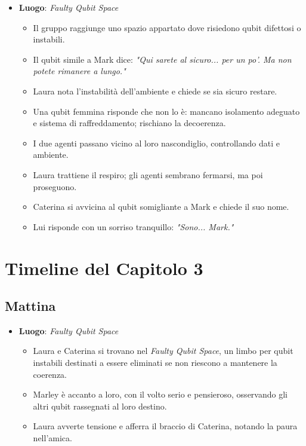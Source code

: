 \begin{itemize}
    \item \textbf{Luogo}: \emph{Faulty Qubit Space}
    \begin{itemize}
        \item Il gruppo raggiunge uno spazio appartato dove risiedono qubit difettosi o instabili.
        \item Il qubit simile a Mark dice: \emph{"Qui sarete al sicuro... per un po'. Ma non potete rimanere a lungo."}
        \item Laura nota l'instabilità dell'ambiente e chiede se sia sicuro restare.
        \item Una qubit femmina risponde che non lo è: mancano isolamento adeguato e sistema di raffreddamento; rischiano la decoerenza.
        \item I due agenti passano vicino al loro nascondiglio, controllando dati e ambiente.
        \item Laura trattiene il respiro; gli agenti sembrano fermarsi, ma poi proseguono.
        \item Caterina si avvicina al qubit somigliante a Mark e chiede il suo nome.
        \item Lui risponde con un sorriso tranquillo: \emph{"Sono... Mark."}
    \end{itemize}
\end{itemize}


\section*{Timeline del Capitolo 3}

\subsection*{Mattina}

\begin{itemize}
    \item \textbf{Luogo}: \emph{Faulty Qubit Space}
    \begin{itemize}
        \item Laura e Caterina si trovano nel \emph{Faulty Qubit Space}, un limbo per qubit instabili destinati a essere eliminati se non riescono a mantenere la coerenza.
        \item Marley è accanto a loro, con il volto serio e pensieroso, osservando gli altri qubit rassegnati al loro destino.
        \item Laura avverte tensione e afferra il braccio di Caterina, notando la paura nell'amica.
    \end{itemize}
\end{itemize}

